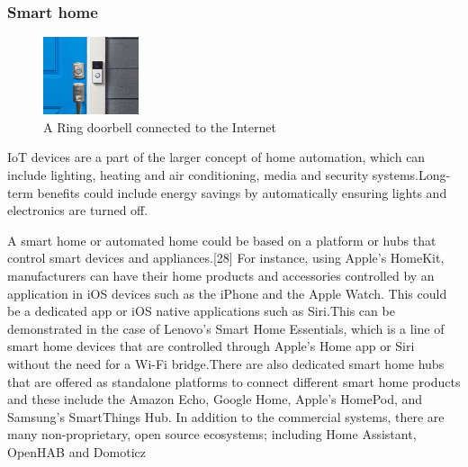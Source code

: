 \documentclass[12pt, a4paper, twoside]{article}
\begin{document}
\subsubsection{Smart home}
\begin{figure} %
    \centering
    \includegraphics[width=0.25\textwidth]{ard}
    \caption{A Ring doorbell connected to the Internet}
\end{figure}
IoT devices are a part of the larger concept of home automation, which can include lighting, heating and air conditioning, media and security systems.Long-term benefits could include energy savings by automatically ensuring lights and electronics are turned off.

A smart home or automated home could be based on a platform or hubs that control smart devices and appliances.[28] For instance, using Apple's HomeKit, manufacturers can have their home products and accessories controlled by an application in iOS devices such as the iPhone and the Apple Watch. This could be a dedicated app or iOS native applications such as Siri.This can be demonstrated in the case of Lenovo's Smart Home Essentials, which is a line of smart home devices that are controlled through Apple's Home app or Siri without the need for a Wi-Fi bridge.There are also dedicated smart home hubs that are offered as standalone platforms to connect different smart home products and these include the Amazon Echo, Google Home, Apple's HomePod, and Samsung's SmartThings Hub. In addition to the commercial systems, there are many non-proprietary, open source ecosystems; including Home Assistant, OpenHAB and Domoticz
\end{document}
